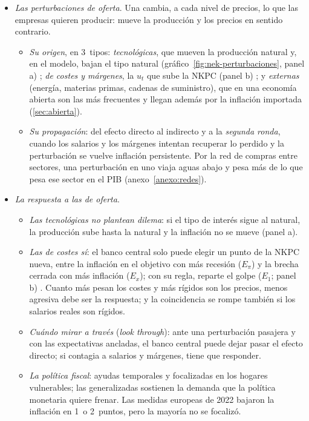 \documentclass[11pt]{article}
\begin{document}
\begin{itemize}
\item \emph{Las perturbaciones de oferta}. Una  cambia, a cada nivel de precios, lo que las empresas quieren producir: mueve la producción y los precios en sentido contrario.
  \begin{itemize}
  \item \emph{Su origen}, en 3~tipos: \emph{tecnológicas}, que mueven la producción natural y, en el modelo, bajan el tipo natural (gráfico~\ref{fig:nek-perturbaciones}, panel a) ; \emph{de costes y márgenes}, la $u_t$ que sube la NKPC (panel b) ; y \emph{externas} (energía, materias primas, cadenas de suministro), que en una economía abierta son las más frecuentes y llegan además por la inflación importada (\ref{sec:abierta}).
  \item \emph{Su propagación}: del efecto directo al indirecto y a la \emph{segunda ronda}, cuando los salarios y los márgenes intentan recuperar lo perdido y la perturbación se vuelve inflación persistente. Por la red de compras entre sectores, una perturbación en uno viaja aguas abajo y pesa más de lo que pesa ese sector en el PIB (anexo~\ref{anexo:redes}).
  \end{itemize}
\item \emph{La respuesta a las de oferta}.
  \begin{itemize}
  \item \emph{Las tecnológicas no plantean dilema}: si el tipo de interés sigue al natural, la producción sube hasta la natural y la inflación no se mueve (panel a).
  \item \emph{Las de costes sí}: el banco central solo puede elegir un punto de la NKPC nueva, entre la inflación en el objetivo con más recesión ($E_\pi$) y la brecha cerrada con más inflación ($E_x$); con su regla, reparte el golpe ($E_1$; panel b) . Cuanto más pesan los costes y más rígidos son los precios, menos agresiva debe ser la respuesta\nocite{Gali2015Monetary}; y la coincidencia se rompe también si los salarios reales son rígidos\nocite{BlanchardGali2007Real}.
  \item \emph{Cuándo mirar a través} (\emph{look through}): ante una perturbación pasajera y con las expectativas ancladas, el banco central puede dejar pasar el efecto directo; si contagia a salarios y márgenes, tiene que responder\nocite{BCE2025Evaluacion}.
  \item \emph{La política fiscal}: ayudas temporales y focalizadas en los hogares vulnerables; las generalizadas sostienen la demanda que la política monetaria quiere frenar. Las medidas europeas de 2022 bajaron la inflación en 1~o 2~puntos, pero la mayoría no se focalizó\nocite{DaoEtAl2023Unconventional}.

\end{itemize}
\end{itemize}
\end{document}
